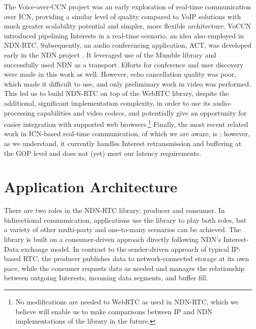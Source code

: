 \documentclass{icn/sig-alternate-2013} %
\newcommand{\ndnrtcName}{NDN-RTC} %
\begin{document}
The Voice-over-CCN project \cite{voccn} was an early exploration of real-time communication over ICN, providing a similar level of quality compared to VoIP solutions with much greater scalability potential and simpler, more flexible architecture. VoCCN introduced pipelining Interests in a real-time scenario, an idea also employed in \ndnrtcName{}. Subsequently, an audio conferencing application, ACT, was developed early in the NDN project \cite{act-tool}. It leveraged use of the Mumble library and successfully used NDN as a transport. Efforts for conference and user discovery were made in this work as well. %
However, echo cancellation quality was poor, which made it difficult to use, and only preliminary work in video was performed. This led us to build \ndnrtcName{} on top of the WebRTC library, despite the additional, significant implementation complexity, in order to use its audio-processing capabilities and video codecs, and potentially give an opportunity for easier integration with supported web browsers.\footnote{No  modifications are needed to WebRTC \cite{webrtc}  as used in \ndnrtcName{}, which we believe will enable us to make comparisons between IP and NDN implementations of the library in the future.}  Finally, the most recent related work in ICN-based real-time communication, of which we are aware, is \cite{huawei-rtc}; however, as we understand, it currently handles Interest retransmission and buffering at the GOP level and does not (yet) meet our latency requirements.


\section{Application Architecture}
\label{sec:arch}

There are two roles in the \ndnrtcName{} library: producer and consumer.  In bidirectional communication, applications use the library to play both roles, but a variety of other multi-party and one-to-many scenarios can be achieved.  The library is built on a consumer-driven approach directly following NDN's Interest-Data exchange model.  In contrast to the sender-driven approach of typical IP-based RTC, the producer publishes data to network-connected storage at its own pace, while the consumer requests data as needed and manages the relationship between outgoing Interests, incoming data segments, and buffer fill. 
%
\end{document}
